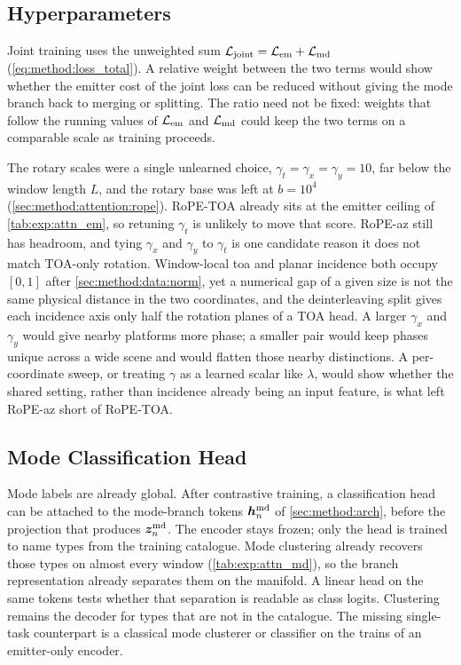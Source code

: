 \subsection{Hyperparameters}\label{sec:concl:future:hparams}

Joint training uses the unweighted sum $\mathcal{L}_{\mathrm{joint}} = \mathcal{L}_{\mathrm{em}} + \mathcal{L}_{\mathrm{md}}$ (\cref{eq:method:loss_total}).
A relative weight between the two terms would show whether the emitter cost of the joint loss can be reduced without giving the mode branch back to merging or splitting.
The ratio need not be fixed: weights that follow the running values of $\mathcal{L}_{\mathrm{em}}$ and $\mathcal{L}_{\mathrm{md}}$ could keep the two terms on a comparable scale as training proceeds.

The rotary scales were a single unlearned choice, $\gamma_t=\gamma_x=\gamma_y=10$, far below the window length $L$, and the rotary base was left at $b=10^{4}$ (\cref{sec:method:attention:rope}).
RoPE-TOA already sits at the emitter ceiling of \cref{tab:exp:attn_em}, so retuning $\gamma_t$ is unlikely to move that score.
RoPE-az still has headroom, and tying $\gamma_x$ and $\gamma_y$ to $\gamma_t$ is one candidate reason it does not match TOA-only rotation.
Window-local \gls{toa} and planar incidence both occupy $[0,1]$ after \cref{sec:method:data:norm}, yet a numerical gap of a given size is not the same physical distance in the two coordinates, and the deinterleaving split gives each incidence axis only half the rotation planes of a TOA head.
A larger $\gamma_x$ and $\gamma_y$ would give nearby platforms more phase; a smaller pair would keep phases unique across a wide scene and would flatten those nearby distinctions.
A per-coordinate sweep, or treating $\gamma$ as a learned scalar like $\lambda$, would show whether the shared setting, rather than incidence already being an input feature, is what left RoPE-az short of RoPE-TOA.

\subsection{Mode Classification Head}\label{sec:concl:future:cls}

Mode labels are already global.
After contrastive training, a classification head can be attached to the mode-branch tokens $\bm{h}^{\mathrm{md}}_n$ of \cref{sec:method:arch}, before the projection that produces $\bm{z}^{\mathrm{md}}_n$.
The encoder stays frozen; only the head is trained to name types from the training catalogue.
Mode clustering already recovers those types on almost every window (\cref{tab:exp:attn_md}), so the branch representation already separates them on the manifold.
A linear head on the same tokens tests whether that separation is readable as class logits.
Clustering remains the decoder for types that are not in the catalogue.
The missing single-task counterpart is a classical mode clusterer or classifier on the trains of an emitter-only encoder.

